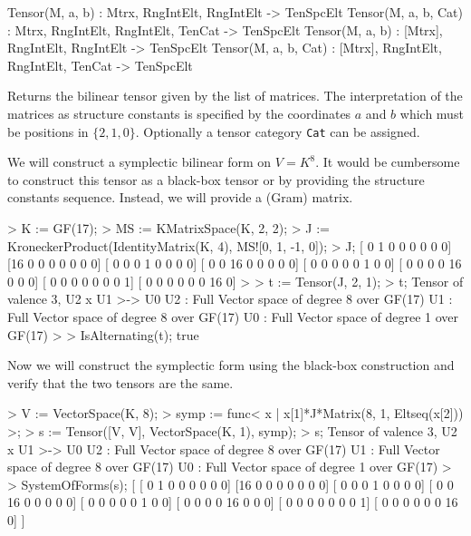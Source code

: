 \begin{intrinsics}
Tensor(M, a, b) : Mtrx, RngIntElt, RngIntElt -> TenSpcElt
Tensor(M, a, b, Cat) : Mtrx, RngIntElt, RngIntElt, TenCat -> TenSpcElt
Tensor(M, a, b) : [Mtrx], RngIntElt, RngIntElt -> TenSpcElt
Tensor(M, a, b, Cat) : [Mtrx], RngIntElt, RngIntElt, TenCat -> TenSpcElt
\end{intrinsics}

Returns the bilinear tensor given by the list of matrices.  The interpretation
of the matrices as structure constants is specified by the coordinates $a$ and
$b$ which must be positions in $\{2,1,0\}$. Optionally a tensor category
\texttt{Cat} can be assigned.


\begin{example}[SymplecticForm]

We will construct a symplectic bilinear form on $V=K^8$. It would be cumbersome
to construct this tensor as a black-box tensor or by providing the structure
constants sequence. Instead, we will provide a (Gram) matrix. 
\begin{code}
> K := GF(17);
> MS := KMatrixSpace(K, 2, 2);
> J := KroneckerProduct(IdentityMatrix(K, 4), MS![0, 1, -1, 0]);
> J;
[ 0  1  0  0  0  0  0  0]
[16  0  0  0  0  0  0  0]
[ 0  0  0  1  0  0  0  0]
[ 0  0 16  0  0  0  0  0]
[ 0  0  0  0  0  1  0  0]
[ 0  0  0  0 16  0  0  0]
[ 0  0  0  0  0  0  0  1]
[ 0  0  0  0  0  0 16  0]
> 
> t := Tensor(J, 2, 1);
> t;
Tensor of valence 3, U2 x U1 >-> U0
U2 : Full Vector space of degree 8 over GF(17)
U1 : Full Vector space of degree 8 over GF(17)
U0 : Full Vector space of degree 1 over GF(17)
> 
> IsAlternating(t);
true
\end{code}

Now we will construct the symplectic form using the black-box construction and
verify that the two tensors are the same. 
\begin{code}
> V := VectorSpace(K, 8);
> symp := func< x | x[1]*J*Matrix(8, 1, Eltseq(x[2])) >;
> s := Tensor([V, V], VectorSpace(K, 1), symp);
> s;
Tensor of valence 3, U2 x U1 >-> U0
U2 : Full Vector space of degree 8 over GF(17)
U1 : Full Vector space of degree 8 over GF(17)
U0 : Full Vector space of degree 1 over GF(17)
> 
> SystemOfForms(s);
[
    [ 0  1  0  0  0  0  0  0]
    [16  0  0  0  0  0  0  0]
    [ 0  0  0  1  0  0  0  0]
    [ 0  0 16  0  0  0  0  0]
    [ 0  0  0  0  0  1  0  0]
    [ 0  0  0  0 16  0  0  0]
    [ 0  0  0  0  0  0  0  1]
    [ 0  0  0  0  0  0 16  0]
]
\end{code}
\end{example}

